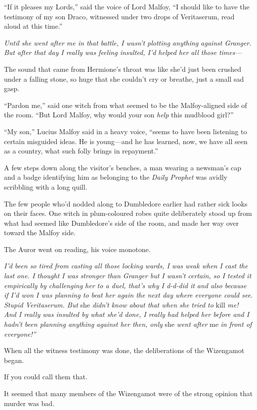 ``If it pleases my Lords,'' said the voice of Lord Malfoy, ``I should
like to have the testimony of my son Draco, witnessed under two drops of
Veritaserum, read aloud at this time.''

\emph{Until she went after me in that battle, I wasn't plotting anything
against Granger. But after that day I really was feeling insulted, I'd
helped her all those times---}

The sound that came from Hermione's throat was like she'd just been
crushed under a falling stone, so huge that she couldn't cry or breathe,
just a small sad gasp.

``Pardon me,'' said one witch from what seemed to be the Malfoy-aligned
side of the room. ``But Lord Malfoy, why would your son \emph{help} this
mudblood girl?''

``My son,'' Lucius Malfoy said in a heavy voice, ``seems to have been
listening to certain misguided ideas. He is young---and he has learned,
now, we have all seen as a country, what such folly brings in
repayment.''

A few steps down along the visitor's benches, a man wearing a newsman's
cap and a badge identifying him as belonging to the \emph{Daily Prophet}
was avidly scribbling with a long quill.

The few people who'd nodded along to Dumbledore earlier had rather sick
looks on their faces. One witch in plum-coloured robes quite
deliberately stood up from what had seemed like Dumbledore's side of the
room, and made her way over toward the Malfoy side.

The Auror went on reading, his voice monotone.

\emph{I'd been so tired from casting all those locking wards, I was weak
when I cast the last one. I thought I was stronger than Granger but I
wasn't certain, so I tested it empirically by challenging her to a duel,
that's why I d-d-did it and also because if I'd won I was planning to
beat her again the next day where everyone could see. Stupid
Veritaserum. But} she \emph{didn't know about that when she tried to}
kill \emph{me! And I really was insulted by what she'd done, I really
had helped her before and I hadn't been planning anything against her
then, only} she \emph{went after} me \emph{in front of everyone!''}

When all the witness testimony was done, the deliberations of the
Wizengamot began.

If you could call them that.

It seemed that many members of the Wizengamot were of the strong opinion
that murder was bad.

